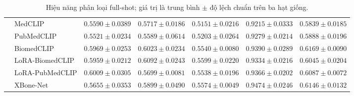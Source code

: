 \begin{table}[H]
{\begin{tabular}{|l|l|c|c|c|c|c|}
 & MedCLIP & $0.5590\pm0.0389$ & $0.5717\pm0.0186$ & $0.5151\pm0.0216$ & $0.9215\pm0.0333$ & $0.5839\pm0.0185$ \\ \cline{2-7}
 & PubMedCLIP & $0.5521\pm0.0234$ & $0.5589\pm0.0614$ & $0.5203\pm0.0264$ & $0.9279\pm0.0214$ & $0.5888\pm0.0196$ \\ \cline{2-7}
 & BiomedCLIP & $0.5969\pm0.0253$ & $0.6023\pm0.0234$ & $0.5540\pm0.0080$ & $0.9390\pm0.0289$ & $\mathbf{0.6169\pm0.0090}$ \\ \cline{2-7}
 & LoRA-BiomedCLIP & $0.5959\pm0.0212$ & $0.6092\pm0.0243$ & $0.5599\pm0.0220$ & $0.9334\pm0.0216$ & $0.6045\pm0.0204$ \\ \cline{2-7}
 & LoRA-PubMedCLIP & $\mathbf{0.6009\pm0.0305}$ & $0.5699\pm0.0081$ & $0.5538\pm0.0196$ & $0.9366\pm0.0202$ & $0.6087\pm0.0072$ \\ \cline{2-7}
 & \cellcolor{gray!12}XBone-Net & \cellcolor{gray!12}$0.5655\pm0.0353$ & \cellcolor{gray!12}$0.5899\pm0.0490$ & \cellcolor{gray!12}$0.5574\pm0.0049$ & \cellcolor{gray!12}$\mathbf{0.9474\pm0.0246}$ & \cellcolor{gray!12}$0.6146\pm0.0132$ \\ \hline
\end{tabular}
}
\caption{Hiệu năng phân loại full-shot; giá trị là trung bình $\pm$ độ lệch chuẩn trên ba hạt giống.}
\label{tab:ch4draft_fullshot}
\end{table}
